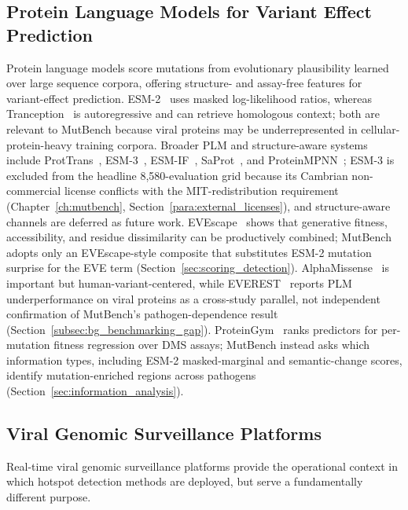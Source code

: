 \subsection{Protein Language Models for Variant Effect Prediction}
\label{subsec:bg_plm}

Protein language models score mutations from evolutionary plausibility learned over large sequence corpora, offering structure- and assay-free features for variant-effect prediction.
ESM-2~\cite{lin2023esm2,rives2021biological} uses masked log-likelihood ratios, whereas Tranception~\cite{notin2022tranception} is autoregressive and can retrieve homologous context; both are relevant to MutBench because viral proteins may be underrepresented in cellular-protein-heavy training corpora.
Broader PLM and structure-aware systems include ProtTrans~\cite{elnaggar2022prottrans}, ESM-3~\cite{hayes2024esm3}, ESM-IF~\cite{hsu2022esmif}, SaProt~\cite{su2024saprot}, and ProteinMPNN~\cite{dauparas2022proteinmpnn}; ESM-3 is excluded from the headline 8{,}580-evaluation grid because its Cambrian non-commercial license conflicts with the MIT-redistribution requirement (Chapter~\ref{ch:mutbench}, Section~\ref{para:external_licenses}), and structure-aware channels are deferred as future work.
EVEscape~\cite{thadani2023evescape} shows that generative fitness, accessibility, and residue dissimilarity can be productively combined; MutBench adopts only an EVEscape-style composite that substitutes ESM-2 mutation surprise for the EVE term (Section~\ref{sec:scoring_detection}).
AlphaMissense~\cite{cheng2023alphamissense} is important but human-variant-centered, while EVEREST~\cite{gurev2025everest,gurev2026everest_v3} reports PLM underperformance on viral proteins as a cross-study parallel, not independent confirmation of MutBench's pathogen-dependence result (Section~\ref{subsec:bg_benchmarking_gap}).
ProteinGym~\cite{notin2023proteingym} ranks predictors for per-mutation fitness regression over DMS assays; MutBench instead asks which information types, including ESM-2 masked-marginal and semantic-change scores, identify mutation-enriched regions across pathogens (Section~\ref{sec:information_analysis}).

\subsection{Viral Genomic Surveillance Platforms}
\label{subsec:bg_surveillance}

Real-time viral genomic surveillance platforms provide the operational context in which hotspot detection methods are deployed, but serve a fundamentally different purpose.

